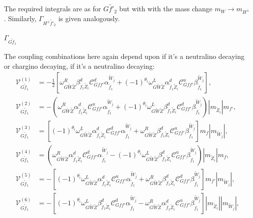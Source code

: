 \documentclass[final,3p,times,pdflatex]{elsarticle}
\begin{document}
The required integrals are as for $G \tilde{f'}_2$ but with with the mass change $m_W \rightarrow m_{H^{\pm}}$. Similarly, $\Gamma_{H^{\pm} \tilde{f'}_2}$ is given analogously.

\textbf{\underline{$\Gamma_{G \tilde{f}_1}$}}

The coupling combinations here again depend upon if it's a neutralino decaying or chargino decaying, if it's a neutralino decaying:
\begin{align}
\mathcal{V}_{G \tilde{f}_1}^{(1)} &= -\frac{1}{2}[\omega_{G \tilde{W} \tilde{Z}}^R \beta_{\tilde{f}_1 \tilde{Z}_i}^{d} \mathcal{C}_{G f f'}^d \alpha_{\tilde{f}_1}^{\tilde{W}_j} + (-1)^{\theta_i} \omega_{G \tilde{W} \tilde{Z}}^L \alpha_{\tilde{f}_1 \tilde{Z}_i}^{d} \mathcal{C}_{G f f'}^u \beta_{\tilde{f}_1}^{\tilde{W}_j}], \\
\mathcal{V}_{G \tilde{f}_1}^{(2)} &= -(\omega_{G \tilde{W} \tilde{Z}}^R \alpha_{\tilde{f}_1 \tilde{Z}_i}^{d} \mathcal{C}_{G f f'}^u \alpha_{\tilde{f}_1}^{\tilde{W}_j} + (-1)^{\theta_i} \omega_{G \tilde{W} \tilde{Z}}^L \beta_{\tilde{f}_1 \tilde{Z}_i}^{d} \mathcal{C}_{G f f'}^d \beta_{\tilde{f}_1}^{\tilde{W}_j})|m_{\tilde{Z}_i}|m_{f'}, \\
\mathcal{V}_{G \tilde{f}_1}^{(3)} &= [(-1)^{\theta_i} \omega_{G \tilde{W} \tilde{Z}}^L \alpha_{\tilde{f}_1 \tilde{Z}_i}^{d}  \mathcal{C}_{G f f'}^d \alpha_{\tilde{f}_1}^{\tilde{W}_j} + \omega_{G \tilde{W} \tilde{Z}}^R \beta_{\tilde{f}_1 \tilde{Z}_i}^{d} \mathcal{C}_{G f f'}^u \beta_{\tilde{f}_1}^{\tilde{W}_j}]m_{f}|m_{\tilde{W}_j}|, \\
\mathcal{V}_{G \tilde{f}_1}^{(4)} &= (\omega_{G \tilde{W} \tilde{Z}}^R \alpha_{\tilde{f}_1 \tilde{Z}_i}^{d} \mathcal{C}_{G f f'}^d \alpha_{\tilde{f}_1}^{\tilde{W}_j} - (-1)^{\theta_i}\omega_{G \tilde{W} \tilde{Z}}^L \beta_{\tilde{f}_1 \tilde{Z}_i}^{d} \mathcal{C}_{G f f'}^u \beta_{\tilde{f}_1}^{\tilde{W}_j})|m_{\tilde{Z}_i}|m_{f}, \\
\mathcal{V}_{G \tilde{f}_1}^{(5)} &= -[(-1)^{\theta_i}\omega_{G \tilde{W} \tilde{Z}}^L \alpha_{\tilde{f}_1 \tilde{Z}_i}^{d} \mathcal{C}_{G f f'}^u \alpha_{\tilde{f}_1}^{\tilde{W}_j} + \omega_{G \tilde{W} \tilde{Z}}^R \beta_{\tilde{f}_1 \tilde{Z}_i}^{d} \mathcal{C}_{G f f'}^d \beta_{\tilde{f}_1}^{\tilde{W}_j}]m_{f'}|m_{\tilde{W}_j}|, \\
\mathcal{V}_{G \tilde{f}_1}^{(6)} &= -[(-1)^{\theta_i} \omega_{G \tilde{W} \tilde{Z}}^L \beta_{\tilde{f}_1 \tilde{Z}_i}^{d} \mathcal{C}_{G f f'}^d \alpha_{\tilde{f}_1}^{\tilde{W}_j} - \omega_{G \tilde{W} \tilde{Z}}^R \alpha_{\tilde{f}_1 \tilde{Z}_i}^{d } \mathcal{C}_{G f f'}^u \beta_{\tilde{f}_1}^{\tilde{W}_j}]|m_{\tilde{Z}_i}||m_{\tilde{W}_j}|, \\

\end{align}
\end{document}
